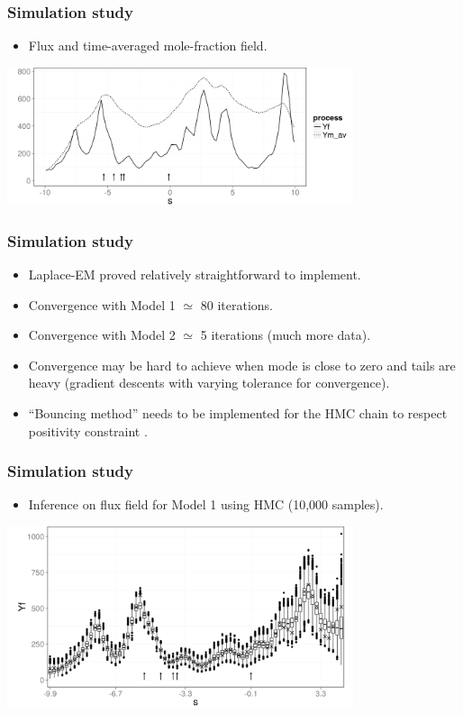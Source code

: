 \documentclass{beamer}
\begin{document}
\begin{frame}
\frametitle{Simulation study}

\begin{itemize}
\item Flux and time-averaged mole-fraction field.
\end{itemize}

\begin{center}
\includegraphics[width=4in]{Sim_plot.png}
\end{center}
\end{frame}

\begin{frame}
\frametitle{Simulation study}

\begin{itemize}
\item Laplace-EM proved relatively straightforward to implement.
\item Convergence with Model 1 $\simeq$ 80 iterations.
\item Convergence with Model 2 $\simeq$ 5 iterations (much more data).
\item Convergence may be hard to achieve when mode is close to zero and tails are heavy (gradient descents with varying tolerance for convergence).
\item ``Bouncing method'' needs to be implemented for the HMC chain to respect positivity constraint \citep{Neal_2011}.
\end{itemize}
\end{frame}


\begin{frame}
\frametitle{Simulation study}

\begin{itemize}
\item Inference on flux field for Model 1 using HMC (10,000 samples).
\end{itemize}

\begin{center}
\includegraphics[width=4in]{Sim1_samples.png}
\end{center}
\end{frame}
\end{document}
